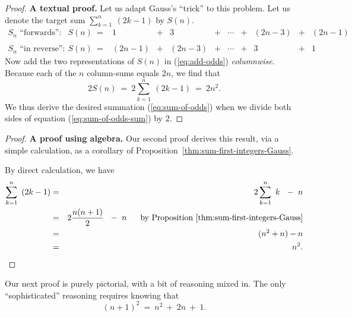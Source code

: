 \begin{proof}
{\bf A textual proof.}
%
Let us adapt Gauss's ``trick'' to this problem.  Let us denote the
target sum $\sum_{k=1}^n \ (2k-1)$ by $S(n)$. 
\begin{equation}
\label{eq:add-odds}
\begin{array}{llccccccccc}
\mbox{$S_n$ ``forwards'':} &
S(n) \ = 
& 1 & + & 3 & + & \cdots & + & (2n-3) & + & (2n-1) \\
 & & & & & & & & & &  \\
\mbox{$S_n$ ``in reverse'':} &
S(n) \ =
& (2n-1) & + & (2n-3) & + & \cdots & + & 3 & + & 1
\end{array}
\end{equation}
Now add the two representations of $S(n)$ in (\ref{eq:add-odds}) {\em
  columnwise}.  Because each of the $n$ column-sums equals $2n$, we
find that
\begin{equation}
\label{eq:sum-of-odds-sum}
2 S(n) \ = \ 2 \sum_{k=1}^n \ (2k-1) \ = \ 2n^2.
\end{equation}
We thus derive the desired summation (\ref{eq:sum-of-odds}) when we
divide both sides of equation (\ref{eq:sum-of-odds-sum}) by $2$.
\end{proof}

\medskip

\begin{proof}
{\bf A proof using algebra.}
%
Our second proof derives this result, via a simple calculation, as a
corollary of Proposition~\ref{thm:sum-first-integers-Gauss}.

By direct calculation, we have
\begin{eqnarray*}
\sum_{k=1}^n \ \left( 2k-1 \right)
   & = & 2 \sum_{k=1}^n \ k \ \ - \ n \\
   & = & 2 \frac{n (n+1)}{2} \ \ - \ n \ \ \ \ \mbox{ by
  Proposition~\ref{thm:sum-first-integers-Gauss}} \\
   & = & (n^2 + n) - n \\
   & = & n^2.
\end{eqnarray*}
\end{proof}

\medskip

Our next proof is purely pictorial, with a bit of reasoning mixed in.
The only ``sophisticated'' reasoning requires knowing that
\[ (n+1)^2 \ = \ n^2 \ + \ 2n \ + \ 1. \]

